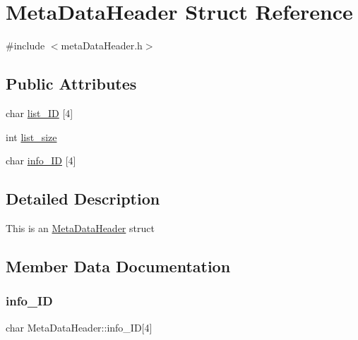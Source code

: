 \hypertarget{structMetaDataHeader}{}\section{Meta\+Data\+Header Struct Reference}
\label{structMetaDataHeader}


{\ttfamily \#include $<$meta\+Data\+Header.\+h$>$}

\subsection*{Public Attributes}
\begin{DoxyCompactItemize}
\item 
char \hyperlink{structMetaDataHeader_af7f56239f7f1b01f7f6ae8add64205ed}{list\+\_\+\+ID} \mbox{[}4\mbox{]}
\item 
int \hyperlink{structMetaDataHeader_aa235aaa4faacbabeefff7826c26138aa}{list\+\_\+size}
\item 
char \hyperlink{structMetaDataHeader_a779d334b540619b63dca0e358541a090}{info\+\_\+\+ID} \mbox{[}4\mbox{]}
\end{DoxyCompactItemize}


\subsection{Detailed Description}
This is an \hyperlink{structMetaDataHeader}{Meta\+Data\+Header} struct 

\subsection{Member Data Documentation}
\mbox{\label{structMetaDataHeader_a779d334b540619b63dca0e358541a090}} 
\subsubsection{\texorpdfstring{info\+\_\+\+ID}{info\_ID}}
{\footnotesize\ttfamily char Meta\+Data\+Header\+::info\+\_\+\+ID\mbox{[}4\mbox{]}}

\mbox{\label{structMetaDataHeader_af7f56239f7f1b01f7f6ae8add64205ed}} 
